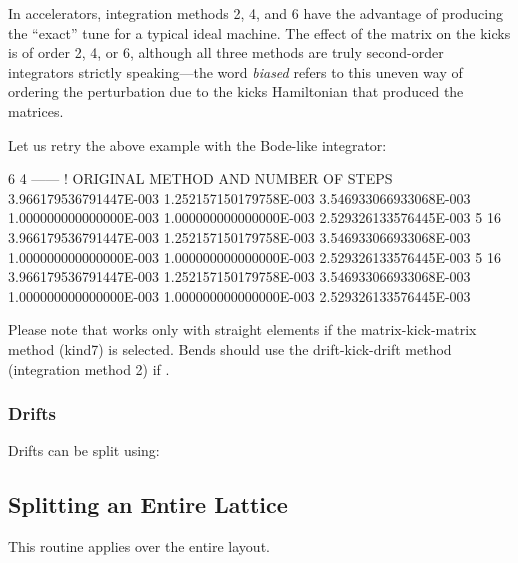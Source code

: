 In accelerators, integration methods 2, 4, and 6 have the advantage of producing
the ``exact'' tune for a typical ideal machine. The effect of the matrix on the kicks is
of order 2, 4, or 6, although all three methods are truly second-order integrators
strictly speaking---the word \emph{biased} refers to this uneven way of ordering
the perturbation due to the kicks Hamiltonian that produced the matrices.

Let us retry the above example with the Bode-like integrator:

\begin{ptccode}
     6      4     ------ ! ORIGINAL METHOD AND NUMBER OF STEPS
3.966179536791447E-003  1.252157150179758E-003  3.546933066933068E-003
1.000000000000000E-003  1.000000000000000E-003  2.529326133576445E-003
     5     16
3.966179536791447E-003  1.252157150179758E-003  3.546933066933068E-003
1.000000000000000E-003  1.000000000000000E-003  2.529326133576445E-003
     5     16
3.966179536791447E-003  1.252157150179758E-003  3.546933066933068E-003
1.000000000000000E-003  1.000000000000000E-003  2.529326133576445E-003
\end{ptccode}

Please note that  works only with straight elements if the matrix-kick-matrix
method (kind7) is selected. Bends should use the drift-kick-drift method (integration method 2) if
 .
 


\subsubsection{Drifts}

%
Drifts can be split using:



\subsection{Splitting an Entire Lattice}

%
This routine applies  over the entire layout.


\endinput
